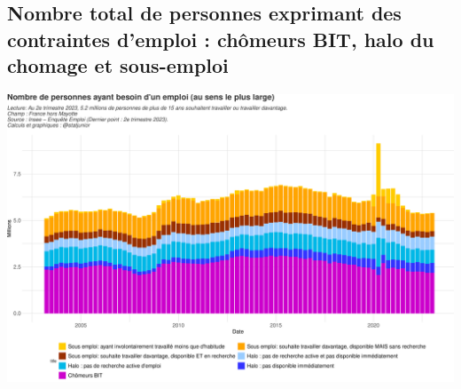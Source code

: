 \documentclass[
  paper=a4,
  ,captions=tableheading
]{scrartcl}
\begin{document}
\hypertarget{nombre-total-de-personnes-exprimant-des-contraintes-demploi-chuxf4meurs-bit-halo-du-chomage-et-sous-emploi}{%
\subsection{Nombre total de personnes exprimant des contraintes d'emploi
: chômeurs BIT, halo du chomage et
sous-emploi}\label{nombre-total-de-personnes-exprimant-des-contraintes-demploi-chuxf4meurs-bit-halo-du-chomage-et-sous-emploi}}

\includegraphics{rapport_activite_emploi_chomage_insee_files/figure-latex/unnamed-chunk-29-1.pdf}
\end{document}
